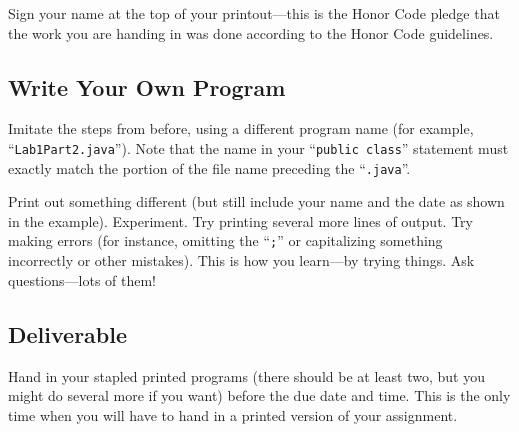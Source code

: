 
       Sign your name at the top of your printout---this is the Honor Code pledge
       that the work you are handing in was done according to the Honor Code guidelines.

       \subsection*{Write Your Own Program}
       Imitate the steps from before, using a different program name (for
         example, ``{\tt Lab1Part2.java}''). Note that the name in your ``{\tt public
         class}'' statement must exactly match the portion of the file name
       preceding the ``{\tt .java}''.

       Print out something different (but still include your name and the date
         as shown in the example). Experiment. Try printing several more lines of output.
       Try making errors (for instance, omitting the ``{\tt ;}'' or capitalizing
         something incorrectly or other mistakes). This is how you learn---by trying
       things. Ask questions---lots of them! 

       \subsection*{Deliverable}
       Hand in your stapled printed programs (there should be
         at least two, but you might do several more if you want) before the due date
       and time. 
       This is the only time when you will have to hand in a printed version of your assignment.

       
